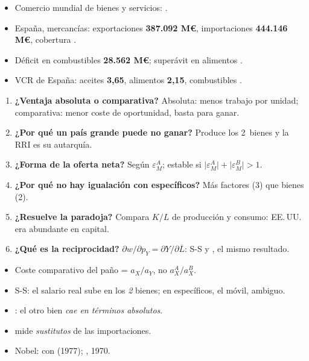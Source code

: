 \documentclass{article}
\begin{document}
\begin{columnas}
\anexorepaso
{}
\begin{itemize}
\item Comercio mundial de bienes y servicios: .
\item España, mercancías: exportaciones \textbf{387.092 M€}, importaciones \textbf{444.146 M€}, cobertura .
\item Déficit en combustibles \textbf{28.562 M€}; superávit en alimentos .
\item VCR de España: aceites \textbf{3,65}, alimentos \textbf{2,15}, combustibles .
\end{itemize}
\begin{enumerate}
\item \textbf{¿Ventaja absoluta o comparativa?} Absoluta: menos trabajo por unidad; comparativa: menor coste de oportunidad, basta para ganar.
\item \textbf{¿Por qué un país grande puede no ganar?} Produce los 2~bienes y la RRI es su autarquía.
\item \textbf{¿Forma de la oferta neta?} Según $\varepsilon^A_M$; estable si $\lvert\varepsilon^A_M\rvert+\lvert\varepsilon^B_M\rvert>1$.
\item \textbf{¿Por qué no hay igualación con específicos?} Más factores (3) que bienes (2).
\item \textbf{¿Resuelve  la paradoja?} Compara $K/L$ de producción y consumo: EE.\,UU. era abundante en capital.
\item \textbf{¿Qué es la reciprocidad?} $\partial w/\partial p_Y=\partial Y/\partial\overline L$: S-S y , el mismo resultado.
\end{enumerate}
\begin{trampa}
\begin{itemize}
\item Coste comparativo del paño = $a_X/a_Y$, no $a_X^A/a_X^B$.
\item S-S: el salario real sube en los \emph{2} bienes; en específicos, el móvil, ambiguo.
\item {}: el otro bien \emph{cae en términos absolutos}.
\item {} mide \emph{sustitutos} de las importaciones.
\item Nobel:  con  (1977); , 1970.
\end{itemize}
\end{trampa}

\end{columnas}
\end{document}
